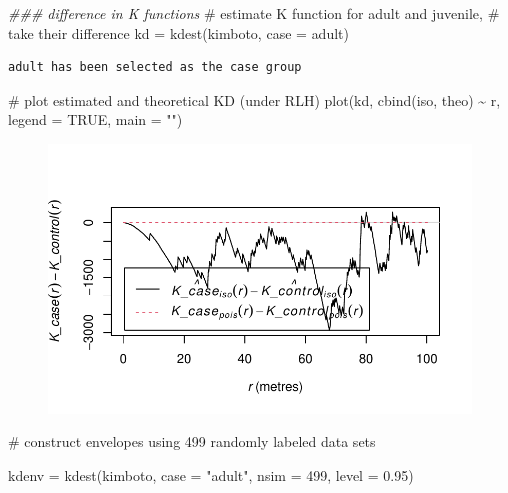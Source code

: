 \documentclass[
  letterpaper,
  DIV=11,
  numbers=noendperiod]{scrartcl}
\newenvironment{Shaded}{\begin{snugshade}}{\end{snugshade}}
\newcommand{\AttributeTok}[1]{\textcolor[rgb]{0.40,0.45,0.13}{#1}}
\newcommand{\CommentTok}[1]{\textcolor[rgb]{0.37,0.37,0.37}{#1}}
\newcommand{\ConstantTok}[1]{\textcolor[rgb]{0.56,0.35,0.01}{#1}}
\newcommand{\DecValTok}[1]{\textcolor[rgb]{0.68,0.00,0.00}{#1}}
\newcommand{\DocumentationTok}[1]{\textcolor[rgb]{0.37,0.37,0.37}{\textit{#1}}}
\newcommand{\FloatTok}[1]{\textcolor[rgb]{0.68,0.00,0.00}{#1}}
\newcommand{\FunctionTok}[1]{\textcolor[rgb]{0.28,0.35,0.67}{#1}}
\newcommand{\NormalTok}[1]{\textcolor[rgb]{0.00,0.23,0.31}{#1}}
\newcommand{\OtherTok}[1]{\textcolor[rgb]{0.00,0.23,0.31}{#1}}
\newcommand{\SpecialCharTok}[1]{\textcolor[rgb]{0.37,0.37,0.37}{#1}}
\newcommand{\StringTok}[1]{\textcolor[rgb]{0.13,0.47,0.30}{#1}}
\begin{document}
\begin{Shaded}
\begin{Highlighting}[]
\DocumentationTok{\#\#\# difference in K functions}
\CommentTok{\# estimate K function for adult and juvenile,}
\CommentTok{\# take their difference}
\NormalTok{kd }\OtherTok{=} \FunctionTok{kdest}\NormalTok{(kimboto, }\AttributeTok{case =} \StringTok{\textquotesingle{}adult\textquotesingle{}}\NormalTok{)}
\end{Highlighting}
\end{Shaded}

\begin{verbatim}
adult has been selected as the case group
\end{verbatim}

\begin{Shaded}
\begin{Highlighting}[]
\CommentTok{\# plot estimated and theoretical KD (under RLH)}
\FunctionTok{plot}\NormalTok{(kd, }\FunctionTok{cbind}\NormalTok{(iso, theo) }\SpecialCharTok{\textasciitilde{}}\NormalTok{ r, }\AttributeTok{legend =} \ConstantTok{TRUE}\NormalTok{, }\AttributeTok{main =} \StringTok{""}\NormalTok{)}
\end{Highlighting}
\end{Shaded}

\begin{figure}[H]

{\centering \includegraphics{cc-r-kd-hw_files/figure-pdf/unnamed-chunk-14-1.pdf}

}

\end{figure}

\begin{Shaded}
\begin{Highlighting}[]
\CommentTok{\# construct envelopes using 499 randomly labeled data sets}

\NormalTok{kdenv }\OtherTok{=} \FunctionTok{kdest}\NormalTok{(kimboto, }\AttributeTok{case =} \StringTok{"adult"}\NormalTok{, }\AttributeTok{nsim =} \DecValTok{499}\NormalTok{,}
              \AttributeTok{level =} \FloatTok{0.95}\NormalTok{)}
\end{Highlighting}
\end{Shaded}
\end{document}
